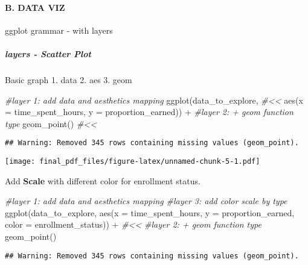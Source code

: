 \documentclass[
]{article}
\newenvironment{Shaded}{\begin{snugshade}}{\end{snugshade}}
\newcommand{\AttributeTok}[1]{\textcolor[rgb]{0.77,0.63,0.00}{#1}}
\newcommand{\CommentTok}[1]{\textcolor[rgb]{0.56,0.35,0.01}{\textit{#1}}}
\newcommand{\FunctionTok}[1]{\textcolor[rgb]{0.00,0.00,0.00}{#1}}
\newcommand{\NormalTok}[1]{#1}
\newcommand{\SpecialCharTok}[1]{\textcolor[rgb]{0.00,0.00,0.00}{#1}}
\begin{document}
\hypertarget{b.-data-viz}{%
\paragraph{B. DATA VIZ}\label{b.-data-viz}}

ggplot grammar - with layers

\hypertarget{layers---scatter-plot}{%
\subparagraph{layers - Scatter Plot}\label{layers---scatter-plot}}

Basic graph 1. data 2. aes 3. geom

\begin{Shaded}
\begin{Highlighting}[]
\CommentTok{\#layer 1: add data and aesthetics mapping }
\FunctionTok{ggplot}\NormalTok{(data\_to\_explore, }\CommentTok{\#\textless{}\textless{}}
       \FunctionTok{aes}\NormalTok{(}\AttributeTok{x =}\NormalTok{ time\_spent\_hours, }
           \AttributeTok{y =}\NormalTok{ proportion\_earned)) }\SpecialCharTok{+}
\CommentTok{\#layer 2: +  geom function type}
  \FunctionTok{geom\_point}\NormalTok{() }\CommentTok{\#\textless{}\textless{}}
\end{Highlighting}
\end{Shaded}

\begin{verbatim}
## Warning: Removed 345 rows containing missing values (geom_point).
\end{verbatim}

\texttt{[image: final\_pdf\_files/figure-latex/unnamed-chunk-5-1.pdf]}

Add \textbf{Scale } with different color for enrollment status.

\begin{Shaded}
\begin{Highlighting}[]
\CommentTok{\#layer 1: add data and aesthetics mapping }
\CommentTok{\#layer 3: add color scale by type}
\FunctionTok{ggplot}\NormalTok{(data\_to\_explore, }
       \FunctionTok{aes}\NormalTok{(}\AttributeTok{x =}\NormalTok{ time\_spent\_hours, }
           \AttributeTok{y =}\NormalTok{ proportion\_earned,}
           \AttributeTok{color =}\NormalTok{ enrollment\_status)) }\SpecialCharTok{+} \CommentTok{\#\textless{}\textless{}}
\CommentTok{\#layer 2: +  geom function type}
  \FunctionTok{geom\_point}\NormalTok{()}
\end{Highlighting}
\end{Shaded}

\begin{verbatim}
## Warning: Removed 345 rows containing missing values (geom_point).
\end{verbatim}
\end{document}
